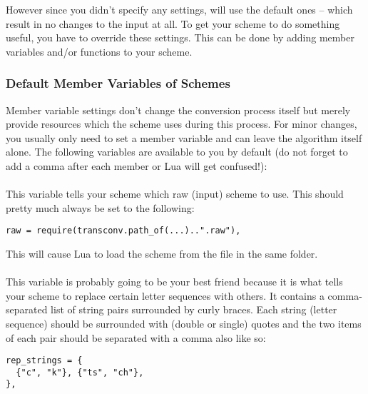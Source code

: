\documentclass{ltxdockit}
\begin{document}
However since you didn't specify any settings,  will use the
default ones -- which result in no changes to the input at all. To get your
scheme to do something useful, you have to override these settings. This can be
done by adding member variables and/or functions to your scheme.

\subsubsection{Default Member Variables of Schemes}

Member variable settings don't change the conversion process itself but merely
provide resources which the scheme uses during this process. For minor changes,
you usually only need to set a member variable and can leave the algorithm
itself alone. The following variables are available to you by default (do not
forget to add a comma after each member or Lua will get confused!):

\paragraph{}

This variable tells your scheme which raw (input) scheme to use. This should
pretty much always be set to the following:

\begin{lstlisting}
raw = require(transconv.path_of(...)..".raw"),
\end{lstlisting}

This will cause Lua to load the scheme from the  file in the same
folder.

\paragraph{}

This variable is probably going to be your best friend because it is what tells
your scheme to replace certain letter sequences with others. It contains a
comma-separated list of string pairs surrounded by curly braces. Each string
(letter sequence) should be surrounded with (double or single) quotes and the
two items of each pair should be separated with a comma also like so:

\begin{lstlisting}
rep_strings = {
  {"c", "k"}, {"ts", "ch"},
},
\end{lstlisting}
\end{document}
